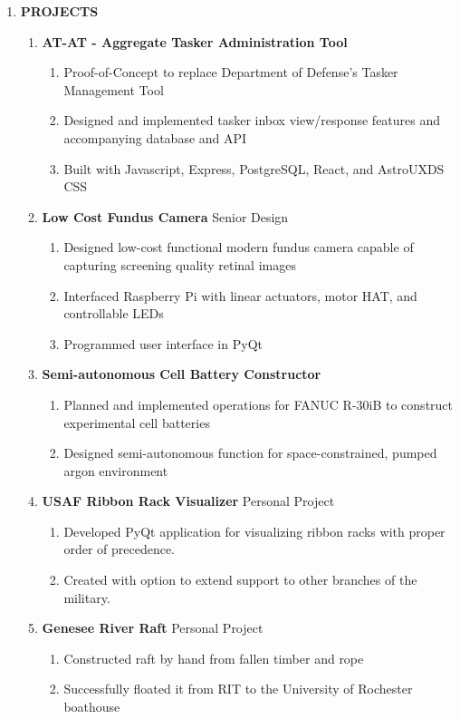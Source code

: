 \documentclass[11pt]{article}
\begin{document}
\begin{center}
\begin{enumerate}[label={}, leftmargin=0pt, parsep=5pt]
    \item {\Large \textbf{PROJECTS}}
    \begin{enumerate}[label={}, itemsep=5pt]
        \item \textbf{AT-AT - Aggregate Tasker Administration Tool}
        \begin{enumerate}[label={--}]
            \item Proof-of-Concept to replace Department of Defense's Tasker Management Tool
            \item Designed and implemented tasker inbox view/response features and accompanying database and API
            \item Built with Javascript, Express, PostgreSQL, React, and AstroUXDS CSS
        \end{enumerate}
        \item \textbf{Low Cost Fundus Camera} \textbar{} Senior Design
        \begin{enumerate}[label={--}]
            \item Designed low-cost functional modern fundus camera capable of capturing screening quality retinal images
            \item Interfaced Raspberry Pi with linear actuators, motor HAT, and controllable LEDs
            \item Programmed user interface in PyQt
        \end{enumerate}
        \item \textbf{Semi-autonomous Cell Battery Constructor}
        \begin{enumerate}[label={--}]
            \item Planned and implemented operations for FANUC R-30iB to construct experimental cell batteries
            \item Designed semi-autonomous function for space-constrained, pumped argon environment
        \end{enumerate}
        \item \textbf{USAF Ribbon Rack Visualizer} \textbar{} Personal Project
        \begin{enumerate}[label={--}]
            \item Developed PyQt application for visualizing ribbon racks with proper order of precedence.
            \item Created with option to extend support to other branches of the military.
        \end{enumerate}
        \item \textbf{Genesee River Raft} \textbar{} Personal Project
        \begin{enumerate}[label={--}]
            \item Constructed raft by hand from fallen timber and rope
            \item Successfully floated it from RIT to the University of Rochester boathouse
        \end{enumerate}
    \end{enumerate}
\end{enumerate}
\end{center}
\end{document}
